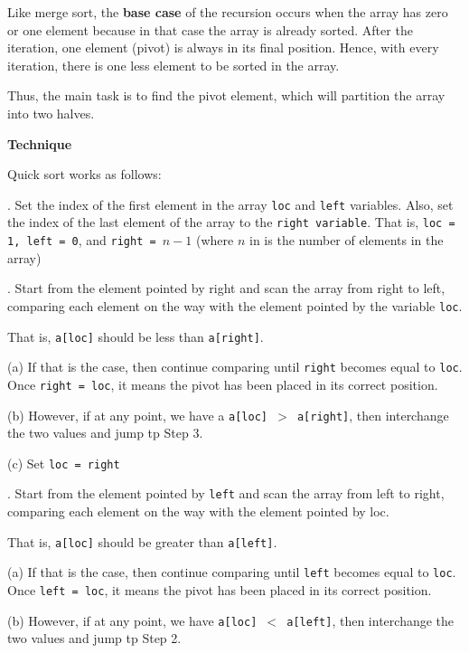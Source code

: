 \vskip 1mm
Like merge sort, the {\bf base case} of the recursion occurs when the array has zero or one element because in that case the array is already sorted. After the iteration, one element (pivot) is always in its final position. Hence, with every iteration, there is one less element to be sorted in the array.

\vskip 1mm
Thus, the main task is to find the pivot element, which will partition the array into two halves.

\vskip 3mm
{\bf Technique}

\vskip 1mm
Quick sort works as follows:

\vskip 3mm
. Set the index of the first element in the array {\tt loc} and {\tt left} variables. Also, set the index of the last element of the array to the {\tt right variable}.
\vskip 1mm
\qquad That is, {\tt loc = 1, left = 0}, and {\tt right = $n-1$} (where  $n$ in is the number of elements in the array)

\vskip 3mm
. Start from the element pointed by right and scan the array from right to left, comparing each element on the way with the element pointed by the variable {\tt loc}.

\vskip 3mm
\qquad That is, {\tt a[loc]} should be less than {\tt a[right]}.

\vskip 3mm
\qquad\qquad(a) If that is the case, then continue comparing until {\tt right} becomes equal to {\tt loc}. Once {\tt right = loc}, it means the pivot has been placed in its correct position.

\vskip 3mm
\qquad\qquad(b) However, if at any point, we have a {\tt a[loc] $>$ a[right]}, then interchange the two values and jump tp Step 3.

\vskip 3mm
\qquad\qquad(c) Set {\tt loc = right}

\vskip 3mm
. Start from the element pointed by {\tt left} and scan the array from left to right, comparing each element on the way with the element pointed by loc.

\vskip 3mm
\qquad That is, {\tt a[loc]} should be greater than {\tt a[left]}.

\vskip 3mm
\qquad\qquad(a) If that is the case, then continue comparing until {\tt left} becomes equal to {\tt loc}. Once {\tt left = loc}, it means the pivot has been placed in its correct position.

\vskip 3mm
\qquad\qquad(b) However, if at any point, we have {\tt a[loc] $<$ a[left]}, then interchange the two values and jump tp Step 2.

